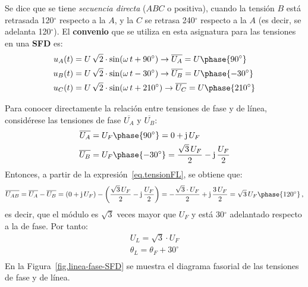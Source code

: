 \documentclass[11pt]{book} %
\numberwithin{dummy}{section}
\theoremstyle{ocrenumbox}
\theoremstyle{blacknumex}
\theoremstyle{blacknumbox}
\theoremstyle{ocrenum}
\newlength\esp
\begin{document}
	Se dice que se tiene \textit{secuencia directa} ($ABC$ o positiva), cuando la tensión $B$ está retrasada 120$^\circ$ respecto a la $A$, y la $C$ se retrasa 240$^\circ$ respecto a la $A$ (es decir, se adelanta 120$^\circ$). El \textbf{convenio} que se utiliza en esta asignatura para las tensiones en una \textbf{SFD} es:
	\begin{align*}
		u_A(t)&=U\,\sqrt{2}\cdot \sin(\omega\, t+90^\circ) \rightarrow \overline{U_A}=U\phase {90^\circ}\\
		u_B(t)&=U\,\sqrt{2}\cdot \sin(\omega\, t-30^\circ)\rightarrow \overline{U_B}=U\phase {-30^\circ}\\
		u_C(t)&=U\,\sqrt{2}\cdot \sin(\omega\,t+210^\circ) \rightarrow \overline{U_C}=U\phase {210^\circ}
	\end{align*}
	
	Para conocer directamente la relación entre tensiones de fase y de línea, considérese las tensiones de fase $\overline{U_A}$ y $\overline{U_B}$: 
	\begin{align*}
		\overline{U_A} &= U_F\phase{90^\circ}=0+\mathrm{j}\,U_F
		\\
		\overline{U_B} &= U_F\phase{-30^\circ}=\dfrac{\sqrt{3}\,U_F}{2}-\mathrm{j}\,\dfrac{U_F}{2}
	\end{align*}
	Entonces, a partir de la expresión~\eqref{eq.tensionFL}, se obtiene que:
	\begin{equation*}
		\overline{U_{AB}}=\overline{U_{A}}-\overline{U_{B}}=(0+\mathrm{j}\,U_F)-\left(\dfrac{\sqrt{3}\,U_F}{2}-\mathrm{j}\,\dfrac{U_F}{2}\right)=-\dfrac{\sqrt{3}\cdot U_F}{2}+\mathrm{j}\,\dfrac{3\,U_F}{2}=\sqrt{3}\,U_F \phase{ 120^\circ}\,,
	\end{equation*}
	es decir, que el módulo es $\sqrt{3}$ veces mayor que $U_F$ y está 30$^\circ$ adelantado respecto a la de fase. Por tanto:  
	\begin{equation}
		\boxed{
			\begin{array}{l}
				U_L = \sqrt{3}\cdot U_F\\
				\theta_L = \theta_F + 30^\circ\\
			\end{array}
		} 
	\end{equation}
	En la Figura~\ref{fig.linea-fase-SFD} se muestra el diagrama fasorial de las tensiones de fase y de línea. 
\end{document}

